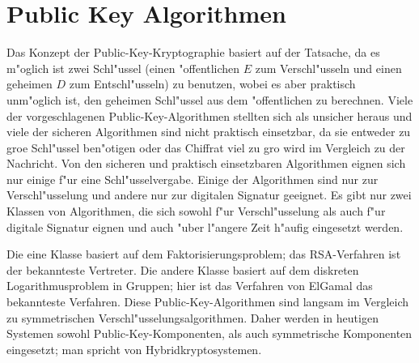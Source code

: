 \chapter{Public Key Algorithmen}
  Das Konzept der Public-Key-Kryptographie basiert auf der 
  Tatsache, da\3 es m"oglich ist zwei Schl"ussel 
  (einen "offentlichen $E$ zum Verschl"usseln und einen geheimen
  $D$ zum Entschl"usseln) zu benutzen, wobei es aber praktisch 
  unm"oglich ist, den geheimen Schl"ussel aus dem "offentlichen 
  zu berechnen. Viele der vorgeschlagenen Public-Key-Algorithmen 
  stellten sich als unsicher heraus und viele der sicheren Algorithmen sind nicht praktisch 
  einsetzbar, da sie entweder zu gro\3e Schl"ussel ben"otigen oder das Chiffrat
  viel zu gro\3 wird im Vergleich zu der Nachricht. Von den sicheren und praktisch 
  einsetzbaren Algorithmen eignen sich nur einige f"ur eine Schl"usselvergabe. 
  Einige der Algorithmen sind nur zur Verschl"usselung und andere nur zur digitalen 
  Signatur geeignet. Es gibt nur zwei Klassen von Algorithmen, die sich sowohl f"ur 
  Verschl"usselung als auch f"ur digitale Signatur eignen und auch "uber l"angere
  Zeit h"aufig eingesetzt werden. 

  Die eine Klasse basiert auf dem Faktorisierungsproblem; 
  das RSA-Verfahren ist der bekannteste Vertreter. Die andere Klasse basiert 
  auf dem diskreten Logarithmusproblem in Gruppen; hier ist das Verfahren von 
  ElGamal das bekannteste Verfahren. Diese Public-Key-Algorithmen sind 
  langsam im Vergleich zu symmetrischen Verschl"usselungsalgorithmen. 
  Daher werden in heutigen Systemen sowohl Public-Key-Komponenten, als auch 
  symmetrische Komponenten eingesetzt; man spricht von Hybridkryptosystemen.
